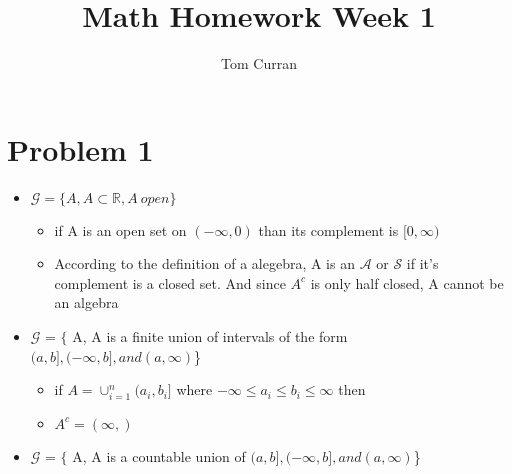 \documentclass{article}
\title{Math Homework Week 1}
\author{Tom Curran}
\theoremstyle{definition}
\begin{document}
\maketitle{}
\section{Problem 1}

\begin{itemize}

\item$\mathcal{G} = \{A, A \subset \mathbb{R}, A \ open \}$

\begin{itemize}
\item if A is an open set on $(-\infty, 0)$ than its complement is $[0, \infty)$
\item According to the definition of a alegebra, A is an $\mathcal{A}$ or $\mathcal{S}$ if it's complement is a closed set. And since $A^c$ is only half closed, A cannot be an algebra
\end{itemize}

\item$\mathcal{G}$ = $\{$ A, A is a finite union of intervals of the form $(a,b], (-\infty, b], and (a,\infty) $\}

\begin{itemize}
  \item if $A = \cup_{i=1}^n (a_i, b_i] $ where $-\infty \leq a_i \leq b_i \leq \infty$ then
  \item $A^c = (\infty, )$
\end{itemize}
\item$\mathcal{G}$ = $\{$ A, A is a countable union of $(a,b], (-\infty, b], and (a,\infty) $\}

\end{itemize}
\end{document}
